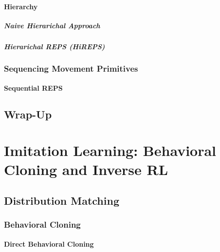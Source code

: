 			\subsubsection{Hierarchy} %

				\paragraph{Naive Hierarichal Approach} %

				\paragraph{Hierarichal REPS (HiREPS)} %

		\subsection{Sequencing Movement Primitives} %

			\subsubsection{Sequential REPS} %

	\section{Wrap-Up} %

\chapter{Imitation Learning: Behavioral Cloning and Inverse RL} %

	\section{Distribution Matching} %

		\subsection{Behavioral Cloning} %

			\subsubsection{Direct Behavioral Cloning} %

